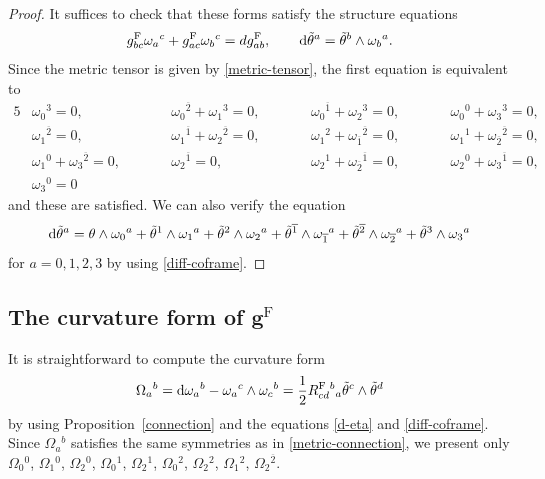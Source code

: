 \documentclass[11pt]{article}
\numberwithin{equation}{section}
\newcommand\ol{\overline}
\numberwithin{equation}{section}
\begin{document}
\begin{proof}
It suffices to check that these forms satisfy the structure equations
\[
g^{\mathrm{F}}_{bc}\omega_a{}^c+g^{\mathrm{F}}_{ac}\omega_b{}^c=dg^{\mathrm{F}}_{ab}, \qquad
{\rm d}\tilde\theta^a=\tilde\theta^b\wedge\omega_b{}^a.
\]
Since the metric tensor is given by \eqref{metric-tensor}, the first equation is equivalent to
\begin{alignat}{5}
&\omega_0{}^3=0,\qquad&& \omega_0{}^{\ol2}+\omega_1{}^3=0,\qquad&& \omega_0{}^{\ol1}+\omega_2{}^3=0,\qquad&& \omega_0{}^0+\omega_3{}^3=0, &\nonumber\\
&\omega_1{}^{\ol2}=0,\qquad&& \omega_1{}^{\ol1}+\omega_2{}^{\ol2}=0,\qquad&& \omega_1{}^{2}+\omega_{\ol1}{}^{\ol2}=0,\qquad&& \omega_1{}^1+\omega_{\ol2}{}^{\ol2}=0,& \nonumber\\
&\omega_1{}^0+\omega_3{}^{\ol2}=0,\qquad&& \omega_2{}^{\ol1}=0,\qquad&& \omega_2{}^{1}+\omega_{\ol2}{}^{\ol1}=0,\qquad&& \omega_2{}^0+\omega_3{}^{\ol1}=0,& \nonumber\\
&\omega_3{}^0=0&\label{metric-connection}
\end{alignat}
and these are satisfied. We can also verify the equation
\[
{\rm d}\tilde\theta^a=\theta\wedge\omega_0{}^a+\tilde\theta^1\wedge\omega_1{}^a+\tilde\theta^2\wedge\omega_2{}^a+\tilde\theta^{\ol1}\wedge\omega_{\ol1}{}^a+\tilde\theta^{\ol2}\wedge\omega_{\ol2}{}^a+\tilde\theta^3\wedge\omega_3{}^a
\]
for $a=0, 1, 2, 3$ by using \eqref{diff-coframe}.
\end{proof}

\subsection[The curvature form of g\^{}F]{The curvature form of $\boldsymbol{g^{\mathrm{F}}}$}
It is straightforward to compute the curvature form
\[
\Omega_a{}^b={\rm d}\omega_a{}^b-\omega_a{}^c\wedge\omega_c{}^b
=\frac{1}{2}R^{\mathrm{F}}_{cd}{}^b{}_a \tilde\theta^c\wedge\tilde\theta^d
\]
by using Proposition~\ref{connection} and the equations \eqref{d-eta} and \eqref{diff-coframe}.
Since $\Omega_a{}^b$ satisfies the same symmetries as in \eqref{metric-connection},
we present only
$\Omega_0{}^0$, $\Omega_1{}^0$, $\Omega_2{}^0$, $\Omega_0{}^{1}$, $\Omega_2{}^1$, $\Omega_0{}^2$, $\Omega_2{}^2$, $\Omega_1{}^2$, $\Omega_2{}^{\ol2}$.
\end{document}

